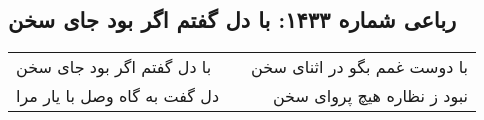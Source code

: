 \begin{center}
\section*{رباعی شماره ۱۴۳۳: با دل گفتم اگر بود جای سخن}
\label{sec:1433}
\begin{longtable}{l p{0.5cm} r}
با دل گفتم اگر بود جای سخن
&&
با دوست غمم بگو در اثنای سخن
\\
دل گفت به گاه وصل با یار مرا
&&
نبود ز نظاره هیچ پروای سخن
\\
\end{longtable}
\end{center}
